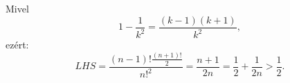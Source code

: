 Mivel
$$
1-\frac{1}{k^{2}}=\frac{(k-1)(k+1)}{k^{2}},
$$
ezért:
$$
LHS=\frac{(n-1)!\frac{(n+1)!}{2}}{{n!}^{2}}=\frac{n+1}{2n}=\frac{1}{2}+\frac{1}{2n}>\frac{1}{2}.
$$
